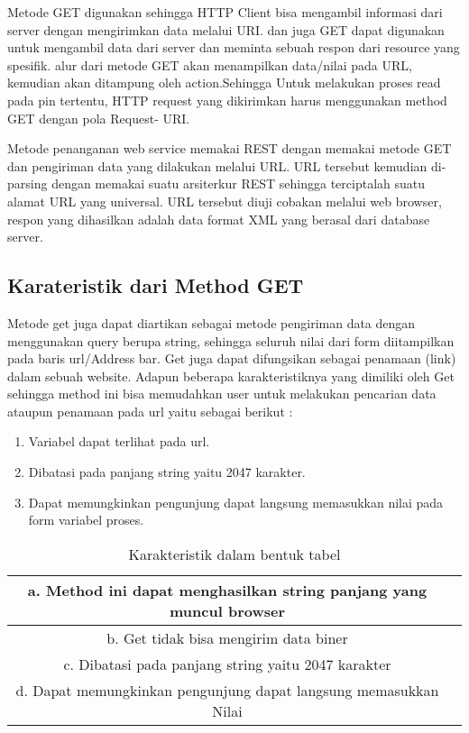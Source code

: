 Metode GET digunakan sehingga HTTP Client bisa mengambil informasi dari server dengan mengirimkan data melalui URI.
dan juga GET dapat digunakan untuk mengambil data dari server dan meminta sebuah respon dari resource yang spesifik.  alur dari 
metode GET akan menampilkan data/nilai pada URL, kemudian akan ditampung oleh action.Sehingga Untuk melakukan proses read pada 
pin tertentu, HTTP request yang dikirimkan harus menggunakan method GET dengan pola Request- URI.

Metode penanganan web service memakai REST dengan memakai metode GET dan pengiriman data yang dilakukan melalui URL. URL 
tersebut kemudian di-parsing dengan memakai suatu arsiterkur REST sehingga terciptalah suatu alamat URL yang universal. URL 
tersebut diuji cobakan melalui web browser, respon yang dihasilkan adalah data format XML yang berasal dari database server. 

\subsection{Karateristik dari Method GET}
Metode get juga dapat diartikan sebagai metode pengiriman data dengan menggunakan query berupa string, sehingga seluruh nilai dari form 
diitampilkan pada baris url/Address bar. Get juga dapat difungsikan sebagai penamaan (link) dalam sebuah website. Adapun beberapa 
karakteristiknya yang dimiliki oleh Get sehingga method ini bisa memudahkan user untuk melakukan pencarian data ataupun penamaan pada 
url yaitu sebagai berikut :
\begin{enumerate}
\item Variabel dapat terlihat pada url.
\item Dibatasi pada panjang string yaitu 2047 karakter.
\item Dapat memungkinkan pengunjung dapat langsung memasukkan nilai pada form variabel proses.
\end{enumerate}

\begin{table} [ht]
\caption{Karakteristik dalam bentuk tabel}
\centering
\begin {tabular} {|cc|}
\hline
a.	Method ini dapat menghasilkan string panjang yang muncul browser & \\
\hline
b.	Get tidak bisa mengirim data biner &\\
\hline
c.	Dibatasi pada panjang string yaitu 2047 karakter & \\
\hline
d.	Dapat memungkinkan pengunjung dapat langsung memasukkan Nilai & \\
\hline
\end{tabular}
\label{ltabel}
\end{table}

